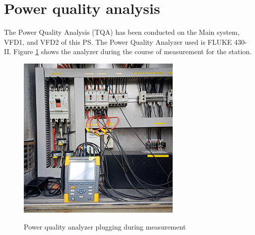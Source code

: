 %
\section{Power quality analysis} \label{ch04_elecaudit_powerquality}
The Power Quality Analysis (TQA) has been conducted on the Main system, VFD1, and VFD2 of this PS. The Power Quality Analyzer used is FLUKE 430-II. Figure \ref{fig_ch04_elecaudit_powerqualityanalyzer} shows the analyzer during the course of measurement for the station.


\begin{figure}
	\includegraphics[scale=0.5]{figures/fig_ch04_elecaudit_powerqualityanalyzer} \\
	\caption{Power quality analyzer plugging during measurement}
	\label{fig_ch04_elecaudit_powerqualityanalyzer} 
\end{figure}


